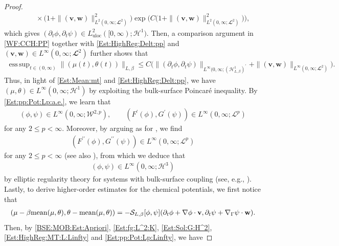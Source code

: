\documentclass[10pt,reqno]{amsart}
\theoremstyle{remark}
\numberwithin{equation}{section}
\DeclareMathOperator*{\esssup}{ess\,sup}
\newcommand{\norm}[1]{\| #1 \|}
\newcommand{\scp}[2]{ ( #1 , #2  )}
\newcommand{\mean}[2]{\textnormal{mean}\scp{#1}{#2}}
\newcommand{\bv}{\mathbf{v}}
\newcommand{\bw}{\mathbf{w}}
\newcommand{\delt}{\partial_{t}}
\newcommand{\Grad}{\nabla}
\newcommand{\Gradg}{\nabla_\Ga}
\newcommand{\Ga}{\Gamma}
\begin{document}
\begin{proof}
\begin{align}
        &\qquad\times \bigg(1 + \norm{(\bv,\bw)}_{L^2(0,\infty;\mathbfcal{L}^2)}^2\Big)\exp\Big(C\big(1 + \norm{(\bv,\bw)}_{L^2(0,\infty;\mathbfcal{L}^2)}^2\big)\bigg), \nonumber
    \end{align}
    which gives $(\delt\phi,\delt\psi)\in L^2_{\mathrm{uloc}}([0,\infty);\mathcal{H}^1)$. Then, a comparison argument in \eqref{WF:CCH:PP} together with \eqref{Est:HighReg:Delt:pp} and $(\bv,\bw)\in L^\infty(0,\infty;\mathbfcal{L}^2)$ further shows that
    \begin{align}\label{Est:HighReg:MT:L:Linfty}
        \esssup_{t\in(0,\infty)}\norm{(\mu(t),\theta(t))}_{L,\beta} \leq C\big(\norm{(\delt\phi,\delt\psi)}_{L^\infty(0,\infty;(\mathcal{H}^1_{L,\beta})^\prime} + \norm{(\bv,\bw)}_{L^\infty(0,\infty;\mathbfcal{L}^2)}\big).
    \end{align}
    Thus, in light of \eqref{Est:Mean:mt} and \eqref{Est:HighReg:Delt:pp}, we have $(\mu,\theta)\in L^\infty(0,\infty;\mathcal{H}^1)$ by exploiting the bulk-surface Poincar\'{e} inequality. By \eqref{Est:pp:Pot:Lp:a.e.}, we learn that
    \begin{align}\label{Est:pp:Pot:Lp:Linfty}
        (\phi,\psi)\in L^\infty(0,\infty;\mathcal{W}^{2,p}), \qquad (F^\prime(\phi),G^\prime(\psi))\in L^\infty(0,\infty;\mathcal{L}^p)
    \end{align}
    for any $2 \leq p < \infty$. Moreover, by arguing as for \cite[Theorem~3.7]{Stange2025}, we find
    \begin{align*}
        (F^{\prime\prime}(\phi), G^{\prime\prime}(\psi)) \in L^\infty(0,\infty;\mathcal{L}^p)
    \end{align*}
    for any $2 \leq p < \infty$ (see also \cite{Lv2024b, Lv2024a}), from which we deduce that
    \begin{align*}
        (\phi,\psi)\in L^\infty(0,\infty;\mathcal{H}^3)
    \end{align*}
    by elliptic regularity theory for systems with bulk-surface coupling (see, e.g., \cite[Theorem~3.3]{Knopf2021}).
    Lastly, to derive higher-order estimates for the chemical potentials, we first notice that
    \begin{align}\label{ID:MT:MEAN:SOL:CONVECTIVE}
        (\mu - \beta\mean{\mu}{\theta},\theta - \mean{\mu}{\theta}) = - \mathcal{S}_{L,\beta}[\phi,\psi](\delt\phi + \Grad\phi\cdot\mathbf{v}, \delt\psi + \Gradg\psi\cdot\mathbf{w}).
    \end{align}
    Then, by \eqref{BSE:MOB:Est:Apriori}, \eqref{Est:fg:L^2:K}, \eqref{Est:Sol:G:H^2}, \eqref{Est:HighReg:MT:L:Linfty} and \eqref{Est:pp:Pot:Lp:Linfty}, we have

\end{proof}
\end{document}
